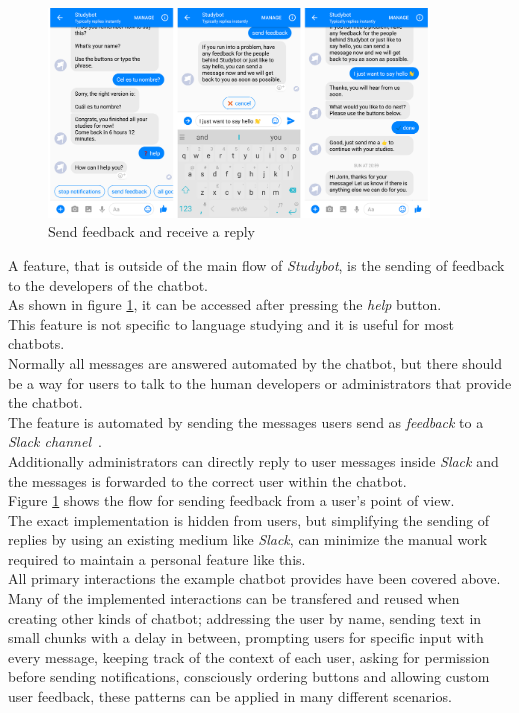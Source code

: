 \begin{figure}[h]
  \centering
  \includegraphics[width=0.9\textwidth]{images/interface/09-feedback.png}
	\caption{Send feedback and receive a reply}
	\label{fig:09-feedback}
\end{figure}

\label{slackhook}

A feature, that is outside of the main flow of \emph{Studybot}, is the sending of feedback to the developers of the chatbot.
\\
As shown in figure \ref{fig:09-feedback}, it can be accessed after pressing the \emph{help} button.
\\
This feature is not specific to language studying and it is useful for most chatbots.
\\
Normally all messages are answered automated by the chatbot,
but there should be a way for users to talk to the human developers or administrators that provide the chatbot.
\\
The feature is automated by sending the messages users send as \emph{feedback}
to a \emph{Slack channel}~\cite{slack}.
\\
Additionally administrators can directly reply to user messages inside \emph{Slack}
and the messages is forwarded to the correct user within the chatbot.
\\
Figure \ref{fig:09-feedback} shows the flow for sending feedback from a user's point of view.
\\
The exact implementation is hidden from users,
but simplifying the sending of replies by using an existing medium like \emph{Slack},
can minimize the manual work required to maintain a personal feature like this.
\\


All primary interactions the example chatbot provides have been covered above.
\\
Many of the implemented interactions can be transfered and reused when creating other kinds of chatbot;
addressing the user by name,
sending text in small chunks with a delay in between,
prompting users for specific input with every message,
keeping track of the context of each user,
asking for permission before sending notifications,
consciously ordering buttons and
allowing custom user feedback,
these patterns can be applied in many different scenarios.
\\

